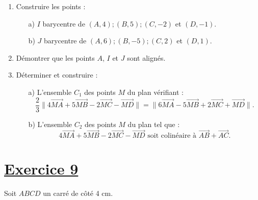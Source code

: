 \documentclass[12pt]{article}
\begin{document}
\begin{enumerate}
    \item Construire les points :
    \begin{enumerate}
        \item[a)] \( I \) barycentre de \( (A, 4); (B, 5); (C, -2) \) et \( (D, -1) \).
        \item[b)] \( J \) barycentre de \( (A, 6); (B, -5); (C, 2) \) et \( (D, 1) \).
    \end{enumerate}
    
    \item Démontrer que les points \( A \), \( I \) et \( J \) sont alignés.
    
    \item Déterminer et construire :
    \begin{enumerate}
        \item[a)] L'ensemble \( C_1 \) des points \( M \) du plan vérifiant :
        \[
        \frac{2}{3} \| 4 \overrightarrow{MA} + 5 \overrightarrow{MB} - 2 \overrightarrow{MC} - \overrightarrow{MD} \| = \| 6 \overrightarrow{MA} - 5 \overrightarrow{MB} + 2 \overrightarrow{MC} + \overrightarrow{MD} \|.
        \]
        
        \item[b)] L'ensemble \( C_2 \) des points \( M \) du plan tel que :
        \[
        4 \overrightarrow{M A} + 5 \overrightarrow{M B} - 2 \overrightarrow{M C} - \overrightarrow{M D} \text{ soit colinéaire à } \overrightarrow{A B} + \overrightarrow{A C}.
        \]
    \end{enumerate}
\end{enumerate}

\section*{\underline{Exercice 9}}

Soit \( ABCD \) un carré de côté 4 cm.
\end{document}
